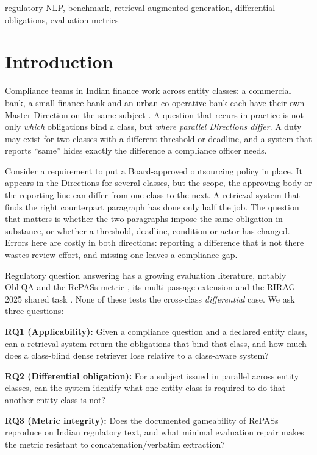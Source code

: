 \documentclass[conference]{IEEEtran}
\begin{document}
\begin{IEEEkeywords}
regulatory NLP, benchmark, retrieval-augmented generation, differential obligations, evaluation metrics
\end{IEEEkeywords}

\section{Introduction}\label{sec:intro}
Compliance teams in Indian finance work across entity classes: a commercial bank, a small finance bank and an urban co-operative
bank each have their own Master Direction on the same subject \cite{rbi}. A question that recurs in practice is not only
\emph{which} obligations bind a class, but \emph{where parallel Directions differ}. A duty may exist for two classes with a
different threshold or deadline, and a system that reports ``same'' hides exactly the difference a compliance officer needs.

Consider a requirement to put a Board-approved outsourcing policy in place. It appears in the Directions for several classes, but
the scope, the approving body or the reporting line can differ from one class to the next. A retrieval system that finds the
right counterpart paragraph has done only half the job. The question that matters is whether the two paragraphs impose the same
obligation in substance, or whether a threshold, deadline, condition or actor has changed. Errors here are costly in both
directions: reporting a difference that is not there wastes review effort, and missing one leaves a compliance gap.

Regulatory question answering has a growing evaluation literature, notably ObliQA and the RePASs metric \cite{gokhan2024regnlp},
its multi-passage extension \cite{obliqamp} and the RIRAG-2025 shared task \cite{gokhan2025riragtask}. None of these tests
the cross-class \emph{differential} case. We ask three questions:

\textbf{RQ1 (Applicability):} Given a compliance question and a declared entity class, can a retrieval system return the
obligations that bind that class, and how much does a class-blind dense retriever lose relative to a class-aware system?

\textbf{RQ2 (Differential obligation):} For a subject issued in parallel across entity classes, can the system identify what
one entity class is required to do that another entity class is not?

\textbf{RQ3 (Metric integrity):} Does the documented gameability of RePASs reproduce on Indian regulatory text, and what minimal
evaluation repair makes the metric resistant to concatenation/verbatim extraction?
\end{document}
